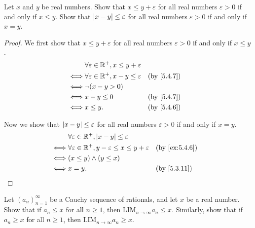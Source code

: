 \begin{ex}\label{ex:5.4.7}
  Let \(x\) and \(y\) be real numbers.
  Show that \(x \leq y + \varepsilon\) for all real numbers \(\varepsilon > 0\) if and only if \(x \leq y\).
  Show that \(\left\lvert x - y\right\rvert \leq \varepsilon\) for all real numbers \(\varepsilon > 0\) if and only if \(x = y\).
\end{ex}

\begin{proof}
  We first show that \(x \leq y + \varepsilon\) for all real numbers \(\varepsilon > 0\) if and only if \(x \leq y\).
  \begin{align*}
         & \forall \varepsilon \in \R^+, x \leq y + \varepsilon                               \\
    \iff & \forall \varepsilon \in \R^+, x - y \leq \varepsilon &  & \text{(by \cref{5.4.7})} \\
    \iff & \lnot (x - y > 0)                                                                  \\
    \iff & x - y \leq 0                                         &  & \text{(by \cref{5.4.7})} \\
    \iff & x \leq y.                                            &  & \text{(by \cref{5.4.6})}
  \end{align*}

  Now we show that \(\left\lvert x - y\right\rvert \leq \varepsilon\) for all real numbers \(\varepsilon > 0\) if and only if \(x = y\).
  \begin{align*}
         & \forall \varepsilon \in \R^+, \abs{x - y} \leq \varepsilon                                                 \\
    \iff & \forall \varepsilon \in \R^+, y - \varepsilon \leq x \leq y + \varepsilon &  & \text{(by \cref{ex:5.4.6})} \\
    \iff & (x \leq y) \land (y \leq x)                                                                                \\
    \iff & x = y.                                                                    &  & \text{(by \cref{5.3.11})}
  \end{align*}
\end{proof}

\begin{ex}\label{ex:5.4.8}
  Let \((a_n)_{n = 1}^{\infty}\) be a Cauchy sequence of rationals, and let \(x\) be a real number.
  Show that if \(a_n \leq x\) for all \(n \geq 1\), then \(\text{LIM}_{n \to \infty} a_n \leq x\).
  Similarly, show that if \(a_n \geq x\) for all \(n \geq 1\), then \(\text{LIM}_{n \to \infty} a_n \geq x\).
\end{ex}

